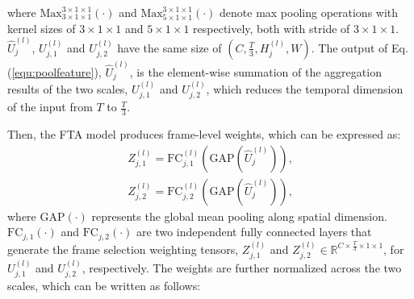 \documentclass[10pt,twocolumn,letterpaper]{article}
\begin{document}
where $\text{Max}_{3 \times 1 \times 1}^{3\times 1 \times 1}\left(\cdot\right)$ and $\text{Max}_{5 \times 1 \times 1}^{3\times 1 \times 1}\left(\cdot\right)$ denote max pooling operations with kernel sizes of $3\times 1 \times 1$ and $5\times 1 \times 1$ respectively, both with stride of $3 \times 1 \times 1$. $\hat{U}_{j}^{(l)}$, $U_{j,1}^{(l)}$ and  $U_{j,2}^{(l)}$ have the same size of $(C,\frac{T}{3},H_j^{(l)},W)$.
The output of Eq.(\ref{equ:poolfeature}), $\hat{U}_{j}^{(l)}$, is the element-wise summation of the aggregation results of the two scales, $U_{j,1}^{(l)}$ and $U_{j,2}^{(l)}$, which reduces the temporal dimension of the input from  $T$ to $\frac{T}{3}$.

Then, the FTA model produces frame-level weights, which can be expressed as:
\begin{equation}
    \begin{gathered}
        Z_{j,1}^{(l)}=\text{FC}_{j,1}^{(l)}\left(\text{GAP}\left(\hat{U}_j^{(l)}\right)\right),\\
        Z_{j,2}^{(l)}=\text{FC}_{j,2}^{(l)}\left(\text{GAP}\left(\hat{U}_j^{(l)}\right)\right),
    \end{gathered}
        \label{equ:weight}
\end{equation}
where $\text{GAP}\left(\cdot\right)$ represents the global mean pooling along spatial dimension.
$\text{FC}_{j,1}\left(\cdot\right)$ and $\text{FC}_{j,2}\left(\cdot\right)$ are two independent fully connected layers that generate the frame selection weighting tensors, $Z_{j,1}^{(l)}$ and $ Z_{j,2}^{(l)} \in \mathbb{R}^{C  \times \frac{T}{3} \times 1 \times 1}$, for $U_{j,1}^{(l)}$ and $U_{j,2}^{(l)}$, respectively. The weights are further normalized across the two scales, which can be written as follows:
\end{document}
